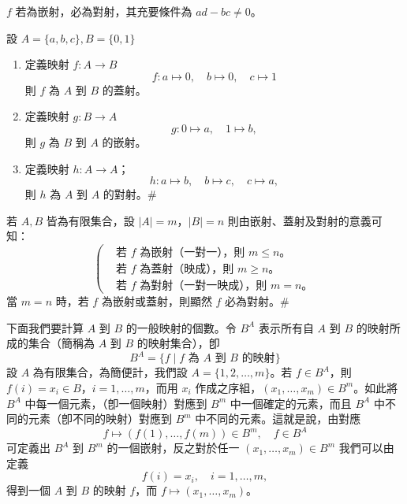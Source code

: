 $f$ 若為嵌射，必為對射，其充要條件為 $ad - bc \ne 0$。

\medskip
\begin{example}\label{ex:b5s-2-4}
設 $A=\{a, b, c\}, B=\{0, 1\}$
\begin{enumerate}[label=(\roman*), topsep=2pt, itemsep=4pt]
  \item 定義映射 $f : A \longrightarrow B$
  \[
  f : a \longmapsto 0,\quad b \longmapsto 0,\quad c \longmapsto 1
  \]
  則 $f$ 為 $A$ 到 $B$ 的蓋射。
  \item 定義映射 $g : B \longrightarrow A$
  \[
  g : 0 \longmapsto a,\quad 1 \longmapsto b,
  \]
  則 $g$ 為 $B$ 到 $A$ 的嵌射。
  \item 定義映射 $h : A \longrightarrow A$；
  \[
  h : a \longmapsto b,\quad b \longmapsto c,\quad c \longmapsto a,
  \]
  則 $h$ 為 $A$ 到 $A$ 的對射。\hfill $\#$
\end{enumerate}
\end{example}

\medskip
\begin{example}\label{ex:b5s-2-5}
若 $A, B$ 皆為有限集合，設 $|A| = m$，$|B| = n$ 則由嵌射、蓋射及對射的意義可知：
\[
\left(
\begin{aligned}
&\text{若 } f \text{ 為嵌射（一對一），則 } m \le n\text{。} \\
&\text{若 } f \text{ 為蓋射（映成），則 } m \ge n\text{。} \\
&\text{若 } f \text{ 為對射（一對一映成），則 } m = n\text{。}
\end{aligned}
\right.
\]
當 $m = n$ 時，若 $f$ 為嵌射或蓋射，則顯然 $f$ 必為對射。\hfill $\#$
\end{example}

\medskip
下面我們要計算 $A$ 到 $B$ 的一般映射的個數。令 $B^A$ 表示所有自 $A$ 到 $B$ 的映射所成的集合（簡稱為 $A$ 到 $B$ 的映射集合），卽
\[
B^A = \{f \mid f \text{ 為 } A \text{ 到 } B \text{ 的映射}\}
\]
設 $A$ 為有限集合，為簡便計，我們設 $A = \{1, 2, \ldots, m\}$。若 $f \in B^A$，則 $f(i) = x_i \in B$，$i = 1, \ldots, m$，而用 $x_i$ 作成之序組，$(x_1, \ldots, x_m) \in B^m$。如此將 $B^A$ 中每一個元素，（卽一個映射）對應到 $B^m$ 中一個確定的元素，而且 $B^A$ 中不同的元素（卽不同的映射）對應到 $B^m$ 中不同的元素。這就是說，由對應
\[
f \longmapsto (f(1), \ldots, f(m)) \in B^m,\quad f \in B^A
\]
可定義出 $B^A$ 到 $B^m$ 的一個嵌射，反之對於任一 $(x_1, \ldots, x_m) \in B^m$ 我們可以由定義
\[
f(i) = x_i,\quad i = 1, \ldots, m,
\]
得到一個 $A$ 到 $B$ 的映射 $f$，而 $f \longmapsto (x_1, \ldots, x_m)$。

